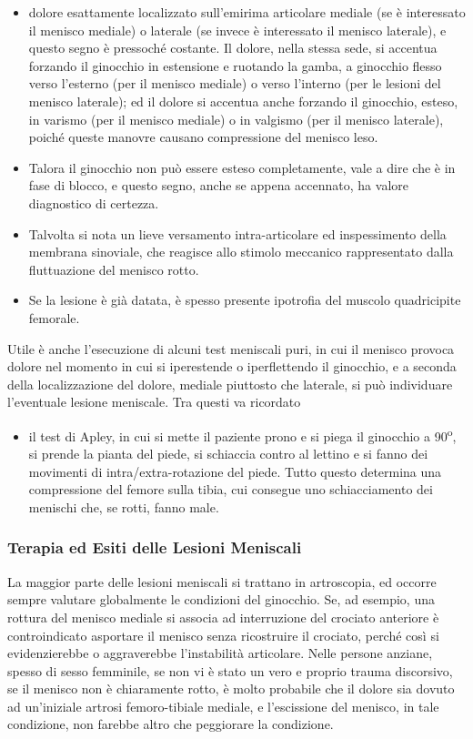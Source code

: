 \begin{itemize}
\item
  dolore esattamente localizzato sull'emirima articolare mediale (se è interessato il menisco mediale) o laterale (se invece è interessato il menisco laterale), e questo segno è pressoché costante. Il dolore, nella stessa sede, si accentua forzando il ginocchio in estensione e ruotando la gamba, a ginocchio flesso verso l'esterno (per il menisco mediale) o verso l'interno (per le lesioni del menisco laterale); ed il dolore si accentua anche forzando il ginocchio, esteso, in varismo (per il menisco mediale) o in valgismo (per il menisco laterale), poiché queste manovre causano compressione del menisco leso.
\item
  Talora il ginocchio non può essere esteso completamente, vale a dire che è in fase di blocco, e questo segno, anche se appena accennato, ha valore diagnostico di certezza.
\item
  Talvolta si nota un lieve versamento intra-articolare ed inspessimento della membrana sinoviale, che reagisce allo stimolo meccanico rappresentato dalla fluttuazione del menisco rotto.
\item
  Se la lesione è già datata, è spesso presente ipotrofia del muscolo quadricipite femorale.
\end{itemize}

Utile è anche l'esecuzione di alcuni test meniscali puri, in cui il menisco provoca dolore nel momento in cui si iperestende o iperflettendo il ginocchio, e a seconda della localizzazione del dolore, mediale piuttosto che laterale, si può individuare l'eventuale lesione meniscale. Tra questi va ricordato

\begin{itemize}
\item
  il test di Apley, in cui si mette il paziente prono e si piega il ginocchio a 90\textsuperscript{o}, si prende la pianta del piede, si schiaccia contro al lettino e si fanno dei movimenti di intra/extra-rotazione del piede. Tutto questo determina una compressione del femore sulla tibia, cui consegue uno schiacciamento dei menischi che, se rotti, fanno male.
\end{itemize}

\subsubsection{Terapia ed Esiti delle Lesioni Meniscali}

La maggior parte delle lesioni meniscali si trattano in artroscopia, ed occorre sempre valutare globalmente le condizioni del ginocchio. Se, ad esempio, una rottura del menisco mediale si associa ad interruzione del crociato anteriore è controindicato asportare il menisco senza ricostruire il crociato, perché così si evidenzierebbe o aggraverebbe l'instabilità articolare. Nelle persone anziane, spesso di sesso femminile, se non vi è stato un vero e proprio trauma discorsivo, se il menisco non è chiaramente rotto, è molto probabile che il dolore sia dovuto ad un'iniziale artrosi femoro-tibiale mediale, e l'escissione del menisco, in tale condizione, non farebbe altro che peggiorare la condizione.

